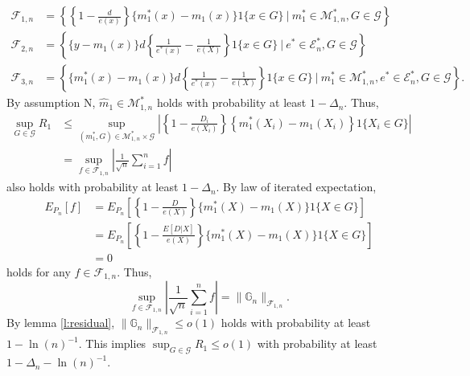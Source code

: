 \documentclass[12pt,oneside,reqno,english]{amsart}
\theoremstyle{definition}
\begin{document}
\begin{align*}
\mathcal{F}_{1,n}&=\left\{\left\{1-\frac{d}{e(x)}\right\}\{m_{1}^{*}(x)-m_{1}(x)\}1\{x\in G\}\ | \ m_{1}^{*}\in \mathcal{M}^{*}_{1,n}, G\in \mathcal{G}\right\}\\
\mathcal{F}_{2,n}&=\left\{\{y-m_{1}(x)\}d\left\{\frac{1}{e^{*}(x)}-\frac{1}{e(X)}\right\}1\{x\in G\} \ |\ e^{*}\in \mathcal{E}^{*}_{n},G\in \mathcal{G}\right\}\\
\mathcal{F}_{3,n}&=\left\{\{m_{1}^{*}(x)-m_{1}(x)\}d\left\{\frac{1}{e^{*}(x)}-\frac{1}{e(X)}\right\}1\{x\in G\} \ | \ m_{1}^{*}\in \mathcal{M}^{*}_{1,n}, 
e^{*}\in \mathcal{E}^{*}_{n},G\in \mathcal{G}\right\}.
\end{align*}
By assumption N, $\hat{m}_{1}\in \mathcal{M}^{*}_{1,n}$ holds with probability at least $1-\Delta_{n}$. Thus, 
\begin{align*}
\sup_{G\in \mathcal{G}}R_{1}&\leq 
\sup_{(m_{1}^{*},G)\in  \mathcal{M}^{*}_{1,n}\times \mathcal{G}}\left|\left\{1-\frac{D_{i}}{e(X_{i})}\right\}\left\{m^{*}_{1}(X_{i})-m_{1}(X_{i})\right\}1\{X_{i}\in G\}\right|\\
&=\sup_{f\in \mathcal{F}_{1,n}}\left|\frac{1}{\sqrt{n}}\sum_{i=1}^{n}f\right|
\end{align*}
also holds with probability at least $1-\Delta_{n}$. 
By law of iterated expectation,
\begin{align*}
E_{P_{n}}[f]&=E_{P_{n}}\left[\left\{1-\frac{D}{e(X)}\right\}\{m_{1}^{*}(X)-m_{1}(X)\}1\{X\in G\}\right]\\
&=E_{P_{n}}\left[\left\{1-\frac{E\left[D|X\right]}{e(X)} \right\}\{m_{1}^{*}(X)-m_{1}(X)\}1\{X\in G\}\right]\\
&=0
\end{align*}
holds for any $f\in \mathcal{F}_{1,n}$.  
Thus, 
\[\sup_{f\in \mathcal{F}_{1,n}}\left|\frac{1}{\sqrt{n}}\sum_{i=1}^{n}f\right|=\|\mathbb{G}_{n}\|_{\mathcal{F}_{1,n}}.\]
By lemma \ref{l:residual}, $\|\mathbb{G}_{n}\|_{\mathcal{F}_{1,n}}\leq o(1)$
holds with probability at least $1-\ln(n)^{-1}$.
This implies
$\sup_{G\in \mathcal{G}}R_{1}\leq o(1)$ with probability at least $1-\Delta_{n}-\ln(n)^{-1}$. 
\end{document}
